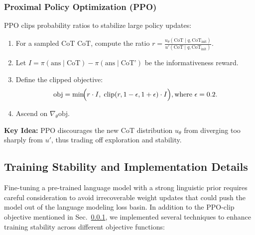 \documentclass{article}
\theoremstyle{plain}
\theoremstyle{definition}
\theoremstyle{remark}
\begin{document}
\subsubsection{Proximal Policy Optimization (PPO)}
\label{subsubsec:ppo}
PPO clips probability ratios to stabilize large policy updates:
\begin{enumerate}
    \item For a sampled CoT $\text{CoT}$, compute the ratio $r = \frac{u_\theta(\text{CoT}\mid q,\text{CoT}_{\text{init}})}{u'(\text{CoT}\mid q,\text{CoT}_{\text{init}})}$.
    \item Let $I = \pi(\text{ans}\mid \text{CoT}) - \pi(\text{ans}\mid \text{CoT'})$ be the informativeness reward.
    \item Define the clipped objective:
    \[
    \text{obj} = \min\!\Bigl(r \cdot I, \;\text{clip}(r,1-\epsilon,1+\epsilon)\cdot I\Bigr), 
     \text{where } \epsilon=0.2.
    \]
    \item Ascend on $\nabla_\theta \text{obj}$.
\end{enumerate}
\textbf{Key Idea:} PPO discourages the new CoT distribution $u_\theta$ from diverging too sharply from $u'$, thus trading off exploration and stability.  


\subsection{Training Stability and Implementation Details}
\label{subsec:stability}
Fine-tuning a pre-trained language model with a strong linguistic prior requires careful consideration to avoid irrecoverable weight updates that could push the model out of the language modeling loss basin. In addition to the PPO-clip objective mentioned in Sec.~\ref{subsubsec:ppo}, we implemented several techniques to enhance training stability across different objective functions:
\end{document}
